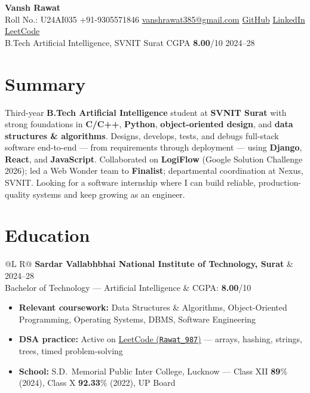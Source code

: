\documentclass[a4paper,10pt]{article}
\makeatletter
\newcommand{\entry}[4]{%
  \vspace{0.5mm}
  \noindent\begin{tabularx}{\textwidth}{@{}L R@{}}
    \textbf{#1} & {\small #2} \\
    {\small #3} & {\small #4} \\
  \end{tabularx}\par
}
\makeatother
\begin{document}
\selectfont

\begin{center}
  {\LARGE \textbf{Vansh Rawat}} \\[1.1mm]
  \small
  Roll No.: U24AI035 \textbar{}
  +91-9305571846 \textbar{}
  \href{mailto:vanshrawat385@gmail.com}{vanshrawat385@gmail.com} \textbar{}
  \href{https://github.com/Vansh-ai406/}{GitHub} \textbar{}
  \href{https://www.linkedin.com/in/vansh-rawat-020612337/}{LinkedIn} \textbar{}
  \href{https://leetcode.com/u/Rawat_987/}{LeetCode} \\[0.35mm]
  B.Tech Artificial Intelligence, SVNIT Surat \textbar{} CGPA \textbf{8.00}/10 \textbar{} 2024--28
\end{center}

\section{Summary}
\noindent\small
Third-year \textbf{B.Tech Artificial Intelligence} student at \textbf{SVNIT Surat} with strong foundations in \textbf{C/C++}, \textbf{Python}, \textbf{object-oriented design}, and \textbf{data structures \& algorithms}.
Designs, develops, tests, and debugs full-stack software end-to-end --- from requirements through deployment --- using \textbf{Django}, \textbf{React}, and \textbf{JavaScript}.
Collaborated on \textbf{LogiFlow} (Google Solution Challenge 2026); led a Web Wonder team to \textbf{Finalist}; departmental coordination at Nexus, SVNIT.
Looking for a software internship where I can build reliable, production-quality systems and keep growing as an engineer.

\section{Education}
\entry{Sardar Vallabhbhai National Institute of Technology, Surat}{2024--28}
{Bachelor of Technology --- Artificial Intelligence}{CGPA: \textbf{8.00}/10}
\begin{itemize}
  \item \textbf{Relevant coursework:} Data Structures \& Algorithms, Object-Oriented Programming, Operating Systems, DBMS, Software Engineering
  \item \textbf{DSA practice:} Active on \href{https://leetcode.com/u/Rawat_987/}{LeetCode (\texttt{Rawat\_987})} --- arrays, hashing, strings, trees, timed problem-solving
  \item \textbf{School:} S.D.\ Memorial Public Inter College, Lucknow --- Class XII \textbf{89}\% (2024), Class X \textbf{92.33}\% (2022), UP Board
\end{itemize}
\end{document}
